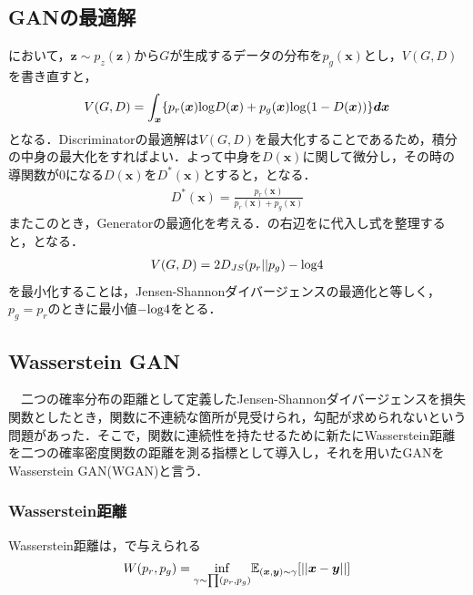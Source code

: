 \subsection{GANの最適解}
において，$\bm z \sim p_z(\bm z)$から$G$が生成するデータの分布を$p_g(\bm x)$とし，$V(G, D)$を書き直すと，
\begin{eqnarray}
	V(G, D) = \int_{\bm x} \{p_r(\bm x) {\rm log}D(\bm x) + p_g(\bm x) {\rm log}(1-D(\bm x)) \} \bm{dx}\label{eq:minmax}
\end{eqnarray}
となる．Discriminatorの最適解は$V(G, D)$を最大化することであるため，積分の中身の最大化をすればよい．よって中身を$D(\bm x)$に関して微分し，その時の導関数が0になる$D(\bm x)$を$D^*(\bm x)$とすると，となる．
\begin{eqnarray}
	D^*(\bm x) = \frac{p_r(\bm x)}{p_r(\bm x) + p_g(\bm x)}\label{eq:dis_opt}
\end{eqnarray}
またこのとき，Generatorの最適化を考える．の右辺をに代入し式を整理すると，となる．
\begin{eqnarray}
	V(G, D) = 2D_{JS}(p_r||p_g)-\rm log4 \label{eq:jensengan}
\end{eqnarray}
を最小化することは，Jensen-Shannonダイバージェンスの最適化と等しく，$p_g = p_r$のときに最小値$- \rm log4$をとる．


\subsection{Wasserstein GAN}
　二つの確率分布の距離として定義したJensen-Shannonダイバージェンスを損失関数としたとき，関数に不連続な箇所が見受けられ，勾配が求められないという問題があった\cite{wgan}．そこで，関数に連続性を持たせるために新たにWasserstein距離を二つの確率密度関数の距離を測る指標として導入し，それを用いたGANをWasserstein GAN(WGAN)と言う．

\subsubsection{Wasserstein距離}
Wasserstein距離は，で与えられる
\begin{eqnarray}
	W(p_r, p_g) = \underset{\gamma \sim \prod(p_r, p_g)}{\rm{inf}} \mathbb E_{(\bm x, \bm y) \sim \gamma} [||\bm x - \bm y||] \label{eq:wasserstein}
\end{eqnarray}


